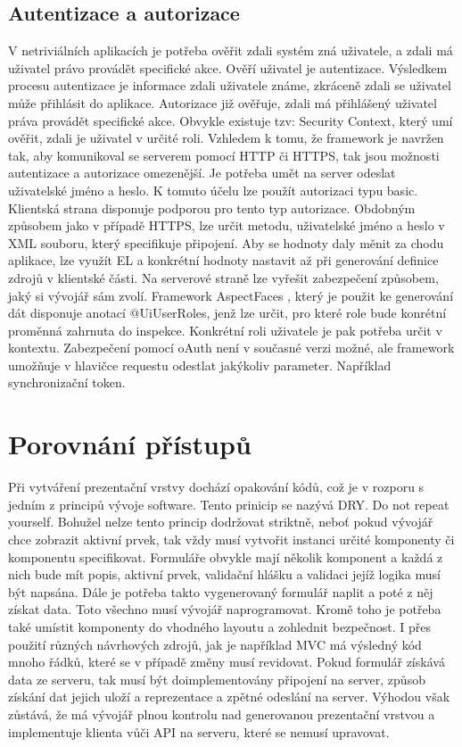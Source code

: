 \subsection{Autentizace a autorizace}
V netriviálních aplikacích je potřeba ověřit zdali systém zná uživatele, a zdali má uživatel právo provádět specifické akce. Ověří uživatel je autentizace. Výsledkem procesu autentizace je informace zdali uživatele známe, zkráceně zdali se uživatel může přihlásit do aplikace. Autorizace již ověřuje, zdali má přihlášený uživatel práva provádět specifické akce. Obvykle existuje tzv: Security Context, který umí ověřit, zdali je uživatel v určité roli. Vzhledem k tomu, že framework je navržen tak, aby komunikoval se serverem pomocí HTTP či HTTPS, tak jsou možnosti autentizace a autorizace omezenější. Je potřeba umět na server odeslat uživatelské jméno a heslo. K tomuto účelu lze použít autorizaci typu basic. Klientská strana disponuje podporou pro tento typ autorizace. Obdobným způsobem jako v případě HTTPS, lze určit metodu, uživatelské jméno a heslo v XML souboru, který specifikuje připojení. Aby se hodnoty daly měnit za chodu aplikace, lze využít EL a konkrétní hodnoty nastavit až při generování definice zdrojů v klientské části. Na serverové straně lze vyřešit zabezpečení způsobem, jaký si vývojář sám zvolí. Framework AspectFaces \cite{aspectFaces}, který je použit ke generování dát disponuje anotací @UiUserRoles, jenž lze určit, pro které role bude konrétní proměnná zahrnuta do inspekce. Konkrétní roli uživatele je pak potřeba určit v kontextu. Zabezpečení pomocí oAuth není v současné verzi možné, ale framework umožňuje v hlavičce requestu odestlat jakýkoliv parameter. Například synchronizační token. 

\section{Porovnání přístupů}
Při vytváření prezentační vrstvy dochází opakování kódů, což je v rozporu s jedním z principů vývoje software. Tento prinicip se nazývá DRY. Do not repeat yourself. Bohužel nelze tento princip dodržovat striktně, neboť pokud vývojář chce zobrazit aktivní prvek, tak vždy musí vytvořit instanci určité komponenty či komponentu specifikovat. Formuláře obvykle mají několik komponent a každá z nich bude mít popis, aktivní prvek, validační hlášku a validaci jejíž logika musí být napsána. Dále je potřeba takto vygenerovaný formulář naplit a poté z něj získat data. Toto všechno musí vývojář naprogramovat. Kromě toho je potřeba také umístit komponenty do vhodného layoutu a zohlednit bezpečnost. I přes použití různých návrhových zdrojů, jak je například MVC \cite{fowler} má výsledný kód mnoho řádků, které se v případě změny musí revidovat. Pokud formulář získává data ze serveru, tak musí být doimplementovány připojení na server, způsob získání dat jejich uloží a reprezentace a zpětné odeslání na server. Výhodou však zůstává, že má vývojář plnou kontrolu nad generovanou prezentační vrstvou a implementuje klienta vůči API na serveru, které se nemusí upravovat.

